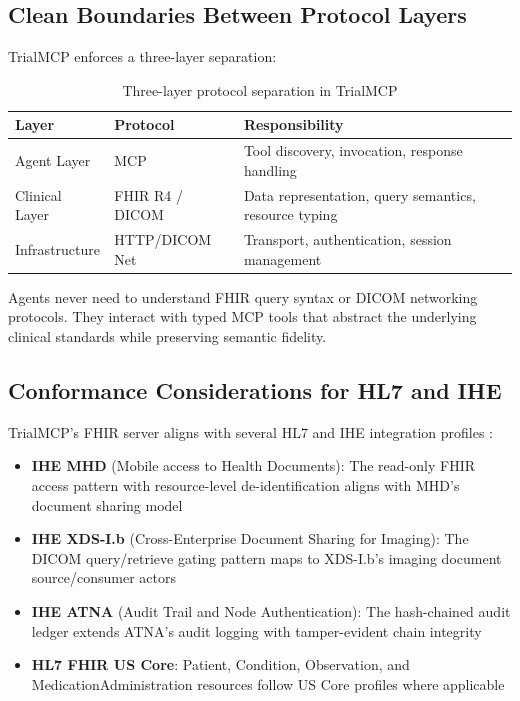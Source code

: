 \documentclass[10pt,letterpaper]{article}
\begin{document}
\subsection{Clean Boundaries Between Protocol Layers}

TrialMCP enforces a three-layer separation:

\begin{table}[H]
\centering
\caption{Three-layer protocol separation in TrialMCP}
\label{tab:layers}
\small
\begin{tabularx}{\textwidth}{l l X}
\toprule
\textbf{Layer} & \textbf{Protocol} & \textbf{Responsibility} \\
\midrule
Agent Layer & MCP & Tool discovery, invocation, response handling \\
Clinical Layer & FHIR R4 / DICOM & Data representation, query semantics, resource typing \\
Infrastructure & HTTP/DICOM Net & Transport, authentication, session management \\
\bottomrule
\end{tabularx}
\end{table}

Agents never need to understand FHIR query syntax or DICOM networking protocols. They interact with typed MCP tools that abstract the underlying clinical standards while preserving semantic fidelity.

\subsection{Conformance Considerations for HL7 and IHE}

TrialMCP's FHIR server aligns with several HL7 and IHE integration profiles \cite{iheprofiles}:

\begin{itemize}[leftmargin=2em]
    \item \textbf{IHE MHD} (Mobile access to Health Documents): The read-only FHIR access pattern with resource-level de-identification aligns with MHD's document sharing model
    \item \textbf{IHE XDS-I.b} (Cross-Enterprise Document Sharing for Imaging): The DICOM query/retrieve gating pattern maps to XDS-I.b's imaging document source/consumer actors
    \item \textbf{IHE ATNA} (Audit Trail and Node Authentication): The hash-chained audit ledger extends ATNA's audit logging with tamper-evident chain integrity
    \item \textbf{HL7 FHIR US Core}: Patient, Condition, Observation, and MedicationAdministration resources follow US Core profiles where applicable
\end{itemize}
\end{document}
